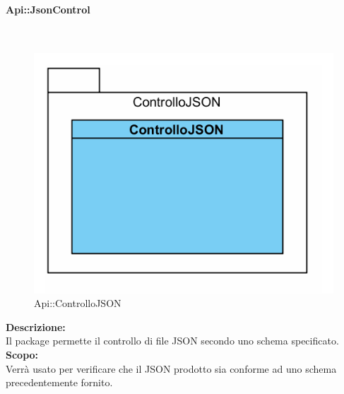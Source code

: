 \begin{samepage}
\paragraph{Api\-::Json\-Control}\label{api-json}\mbox{}\\
\begin{figure}[H]
	\centering
	\includegraphics[width=14cm]{diagrammi_img/classi_e_package/api_json.png}
	\caption{Api\-::ControlloJSON}
\end{figure}
\end{samepage}
\textbf{Descrizione:}\\ 
Il package permette il controllo di file JSON secondo uno schema specificato.\\ 
\textbf{Scopo:}\\
Verrà usato per verificare che il JSON prodotto sia conforme ad uno schema precedentemente fornito.

